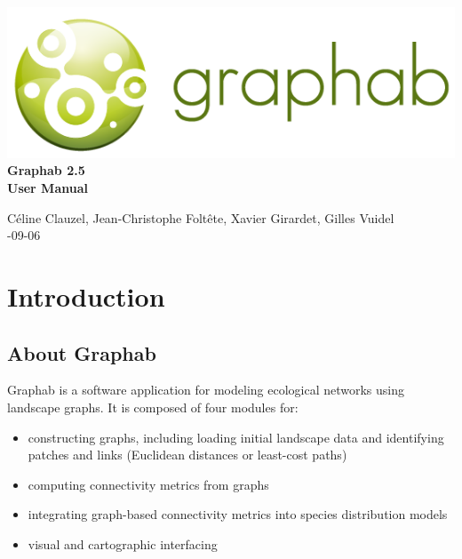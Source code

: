 \documentclass{article}
\begin{document}
\begin{titlepage}

	\centering
	\includegraphics[scale=0.5]{img/logo.png}\\
	
	\bigskip
	\bigskip
	\bigskip	
	{\Huge
	\bfseries
	Graphab 2.5\\
	\bigskip
	User Manual\\
	}
	\bigskip
	\bigskip
	\bigskip
	\bigskip
	\bigskip
			
	{\Large		
	Céline Clauzel, Jean-Christophe Foltête, Xavier Girardet, Gilles Vuidel\\
	-09-06\\
	}
	
\end{titlepage}

\setcounter{tocdepth}{2}
\tableofcontents

\pagebreak

\section{Introduction}

\subsection{About Graphab}

Graphab is a software application for modeling ecological networks using landscape graphs. It is composed of four modules for:
\begin{itemize}
	\item constructing graphs, including loading initial landscape data and identifying patches and links (Euclidean distances or least-cost paths)
	\item computing connectivity metrics from graphs
	\item integrating graph-based connectivity metrics into species distribution models
	\item visual and cartographic interfacing 
\end{itemize}
\end{document}
